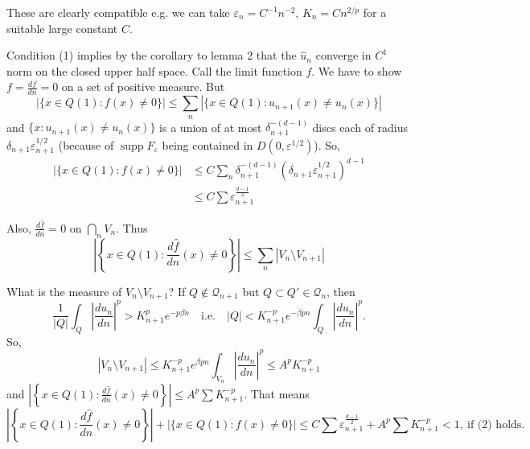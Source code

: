 \documentclass[11pt,reqno]{amsart}
\newcommand{\dn}[1]{\frac{d#1}{dn}}
\newcommand{\he}[1]{\widehat{#1}}          %
\DeclareMathOperator{\supp}{supp}
\begin{document}
These are clearly compatible e.g. we can take $\varepsilon_n=C^{-1}n^{-2}$,
$K_n=Cn^{2/p}$ for a suitable large constant $C$.

Condition (1) implies by the corollary to lemma 2 that the $\he{u}_n$ converge in
$C^1$ norm on the closed upper half space.
Call the limit function $f$.  We have to show $f=\dn{f}=0$ on a set of positive
measure.  But
\begin{equation*}
 |\{x\in Q(1):f(x)\neq 0\}|\leq\sum_n|\{x\in Q(1):u_{n+1}(x)\neq u_n(x)\}|
\end{equation*}
and $\{x:u_{n+1}(x)\neq u_n(x)\}$ is a union of at most $\delta_{n+1}^{-(d-1)}$
discs each of radius $\delta_{n+1}\varepsilon_{n+1}^{1/2}$ (because of
$\supp F_\varepsilon$ being contained in $D(0,\varepsilon^{1/2})$).  So,
\begin{align*}
 |\{x\in Q(1):f(x)\neq 0\}|
 &\leq C\sum_n\delta_{n+1}^{-(d-1)}\left(\delta_{n+1}\varepsilon_{n+1}^{1/2}\right)^{d-1}\\
 &\leq C\sum\varepsilon_{n+1}^{\frac{d-1}{2}}
\end{align*}

Also, $\dn{\he{f}}=0$ on $\bigcap_n V_n$.  Thus
\begin{equation*}
 \left|\left\{x\in Q(1):\dn{\he{f}}(x)\neq 0\right\}\right|
  \leq\sum_n|V_n\setminus V_{n+1}|
\end{equation*}

What is the measure of $V_n\setminus V_{n+1}$?  If $Q\notin\mathcal{Q}_{n+1}$ but
$Q\subset Q'\in\mathcal{Q}_n$, then
\begin{equation*}
 \frac{1}{|Q|}\int_Q\left|\dn{u_n}\right|^{p}>K_{n+1}^{p}e^{-p\beta n}
 \quad\text{i.e.}\quad
 |Q|<K_{n+1}^{-p}e^{-\beta pn}\int_Q\left|\dn{u_n}\right|^{p}.
\end{equation*}
So,
\begin{equation*}
 |V_n\setminus V_{n+1}|\leq K_{n+1}^{-p}e^{\beta pn}\int_{V_n}\left|\dn{u_n}\right|^{p}
 \leq A^{p}K_{n+1}^{-p}
\end{equation*}
and $\left|\left\{x\in Q(1):\dn{\he{f}}(x)\neq 0\right\}\right|
\leq A^{p}\sum K_{n+1}^{-p}$.  That means
\begin{equation*}
 \left|\left\{x\in Q(1):\dn{\he{f}}(x)\neq 0\right\}\right|
 +|\{x\in Q(1):f(x)\neq 0\}|
 \leq C\sum\varepsilon_{n+1}^{\frac{d-1}{2}}+A^{p}\sum K_{n+1}^{-p}
 <1,\ \text{if (2) holds.}
\end{equation*}
\end{document}

